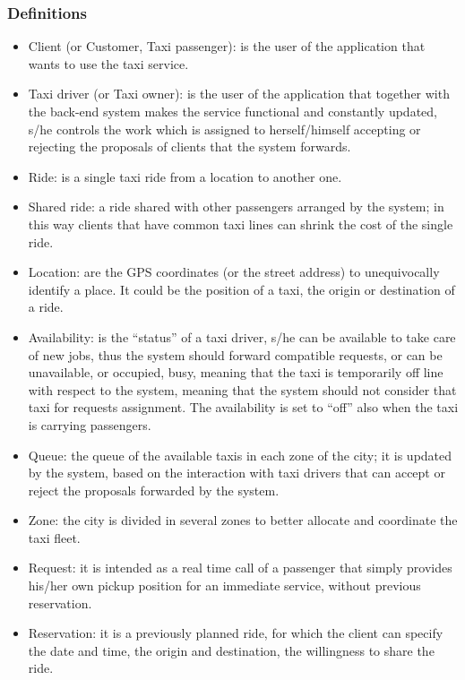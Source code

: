\documentclass[a4paper,11pt]{report} %
\begin{document}
	\subsubsection{Definitions}
		\begin{itemize}
			\item Client (or Customer, Taxi passenger): is the user of the application that wants to use the taxi service.
			\item Taxi driver (or Taxi owner): is the user of the application that together with the back-end system makes the service functional and constantly updated, s/he controls the work which is assigned to herself/himself accepting or rejecting the proposals of clients that the system forwards. 
			\item Ride: is a single taxi ride from a location to another one.
			\item Shared ride: a ride shared with other passengers arranged by the system; in this way clients that have common taxi lines can shrink the cost of the single ride.
			\item Location: are the GPS coordinates (or the street address) to unequivocally identify a place. It could be the position of a taxi, the origin or destination of a ride.
			\item Availability: is the ``status'' of a taxi driver, s/he can be available to take care of new jobs, thus the system should forward compatible requests, or can be unavailable, or occupied, busy, meaning that the taxi is temporarily off line with respect to the system, meaning that the system should not consider that taxi for requests assignment. The availability is set to ``off'' also when the taxi is carrying passengers.
			\item Queue: the queue of the available taxis in each zone of the city; it is updated by the system, based on the interaction with taxi drivers that can accept or reject the proposals forwarded by the system. 
			\item Zone: the city is divided in several zones to better allocate and coordinate the taxi fleet.
			\item Request: it is intended as a real time call of a passenger that simply provides his/her own pickup position for an immediate service, without previous reservation.
			\item Reservation: it is a previously planned ride, for which the client can specify the date and time, the origin and destination, the willingness to share the ride.
		\end{itemize}
		
\end{document}
